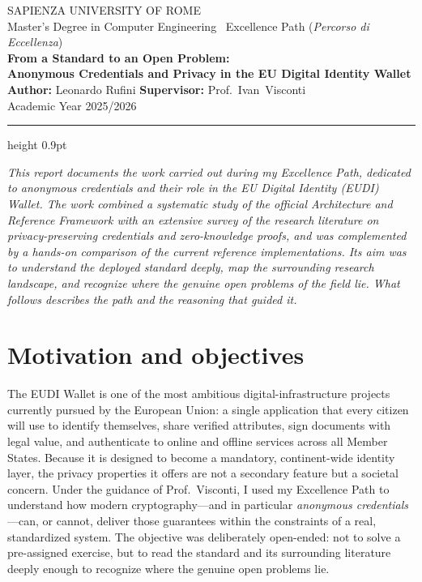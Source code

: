 \documentclass[11pt]{article}
\begin{document}
\begin{center}
  {\footnotesize\sffamily\color{gray}%
   SAPIENZA UNIVERSITY OF ROME \\[1pt]
   Master's Degree in Computer Engineering \textbullet\ Excellence Path (\textit{Percorso di Eccellenza})}\\[10pt]
  {\LARGE\sffamily\bfseries\color{accent} From a Standard to an Open Problem:}\\[3pt]
  {\large\sffamily\bfseries\color{accent} Anonymous Credentials and Privacy in the EU Digital Identity Wallet}\\[10pt]
  {\normalsize\sffamily
   \textbf{Author:} Leonardo Rufini \qquad \textbf{Supervisor:} Prof.\ Ivan\ Visconti}\\[2pt]
  {\footnotesize\sffamily\color{gray} Academic Year 2025/2026}
\end{center}

\vspace{2pt}
{\color{accent}\hrule height 0.9pt}
\vspace{8pt}

\noindent\textit{\small This report documents the work carried out during my Excellence Path, dedicated to anonymous credentials and their role in the EU Digital Identity (EUDI) Wallet. The work combined a systematic study of the official Architecture and Reference Framework with an extensive survey of the research literature on privacy-preserving credentials and zero-knowledge proofs, and was complemented by a hands-on comparison of the current reference implementations. Its aim was to understand the deployed standard deeply, map the surrounding research landscape, and recognize where the genuine open problems of the field lie. What follows describes the path and the reasoning that guided it.}

\vspace{4pt}

\section{Motivation and objectives}
The EUDI Wallet is one of the most ambitious digital-infrastructure projects currently pursued by the European Union: a single application that every citizen will use to identify themselves, share verified attributes, sign documents with legal value, and authenticate to online and offline services across all Member States. Because it is designed to become a mandatory, continent-wide identity layer, the privacy properties it offers are not a secondary feature but a societal concern. Under the guidance of Prof.\ Visconti, I used my Excellence Path to understand how modern cryptography---and in particular \emph{anonymous credentials}---can, or cannot, deliver those guarantees within the constraints of a real, standardized system. The objective was deliberately open-ended: not to solve a pre-assigned exercise, but to read the standard and its surrounding literature deeply enough to recognize where the genuine open problems lie.
\end{document}
